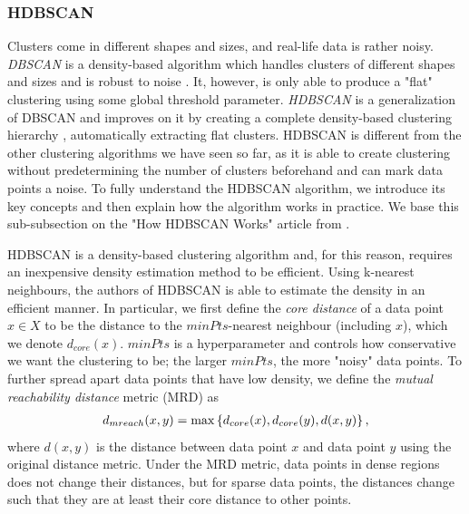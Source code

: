\subsubsection{HDBSCAN}
\label{sec:hdbscan-clustering}
Clusters come in different shapes and sizes, and real-life data is rather noisy. \textit{DBSCAN} is a density-based algorithm which handles clusters of different shapes and sizes and is robust to noise \cite{Ester1996}. It, however, is only able to produce a "flat" clustering using some global threshold parameter. \textit{HDBSCAN} is a generalization of DBSCAN and improves on it by creating a complete density-based clustering hierarchy \cite{Campello2013}, automatically extracting flat clusters. HDBSCAN is different from the other clustering algorithms we have seen so far, as it is able to create clustering without predetermining the number of clusters beforehand and can mark data points a noise. To fully understand the HDBSCAN algorithm, we introduce its key concepts and then explain how the algorithm works in practice. We base this sub-subsection on the "How HDBSCAN Works" article from \cite{how-hdbscan-works-2016}.

HDBSCAN is a density-based clustering algorithm and, for this reason, requires an inexpensive density estimation method to be efficient. Using k-nearest neighbours, the authors of HDBSCAN is able to estimate the density in an efficient manner. In particular, we first define the \textit{core distance} of a data point $x \in X$ to be the distance to the $\textit{minPts}$-nearest neighbour (including $x$), which we denote $d_{core}(x)$. $\textit{minPts}$ is a hyperparameter and controls how conservative we want the clustering to be; the larger $\textit{minPts}$, the more "noisy" data points. To further spread apart data points that have low density, we define the \textit{mutual reachability distance} metric (MRD) as
\begin{align}
    d_{mreach}(x, y) = \max \left\{ d_{core}(x), d_{core}(y), d(x, y) \right\},
    \label{eqn:mutual_reachability_distance}
\end{align}
where $d(x, y)$ is the distance between data point $x$ and data point $y$ using the original distance metric. Under the MRD metric, data points in dense regions does not change their distances, but for sparse data points, the distances change such that they are at least their core distance to other points.

